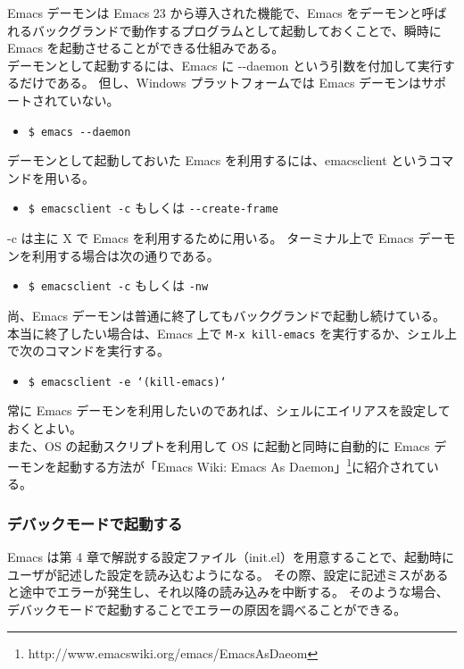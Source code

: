 Emacs デーモンは Emacs 23 から導入された機能で、Emacs をデーモンと呼ばれるバックグランドで動作するプログラムとして起動しておくことで、瞬時に Emacs を起動させることができる仕組みである。\\

デーモンとして起動するには、Emacs に -{}-daemon という引数を付加して実行するだけである。
但し、Windows プラットフォームでは Emacs デーモンはサポートされていない。
\begin{itemize}\setlength{\leftskip}{-1.00zw}%
\item[] \texttt{\$ emacs -{}-daemon}
\end{itemize}
デーモンとして起動しておいた Emacs を利用するには、emacsclient というコマンドを用いる。
\begin{itemize}\setlength{\leftskip}{-1.00zw}%
\item[] \texttt{\$ emacsclient -c} もしくは \texttt{-{}-create-frame}
\end{itemize}
-c は主に X で Emacs を利用するために用いる。
ターミナル上で Emacs デーモンを利用する場合は次の通りである。
\begin{itemize}\setlength{\leftskip}{-1.00zw}%
\item[] \texttt{\$ emacsclient -c} もしくは \texttt{-nw}
\end{itemize}
尚、Emacs デーモンは普通に終了してもバックグランドで起動し続けている。
本当に終了したい場合は、Emacs 上で \texttt{M-x kill-emacs} を実行するか、シェル上で次のコマンドを実行する。
\begin{itemize}\setlength{\leftskip}{-1.00zw}%
\item[] \texttt{\$ emacsclient -e `(kill-emacs)`}
\end{itemize}
常に Emacs デーモンを利用したいのであれば、シェルにエイリアスを設定しておくとよい。\\

また、OS の起動スクリプトを利用して OS に起動と同時に自動的に Emacs デーモンを起動する方法が「Emacs Wiki: Emacs As  Daemon」\footnote{http://www.emacswiki.org/emacs/EmacsAsDaeom}に紹介されている。
\subsubsection{デバックモードで起動する}
Emacs は第 4 章で解説する設定ファイル（init.el）を用意することで、起動時にユーザが記述した設定を読み込むようになる。
その際、設定に記述ミスがあると途中でエラーが発生し、それ以降の読み込みを中断する。
そのような場合、デバックモードで起動することでエラーの原因を調べることができる。\\

